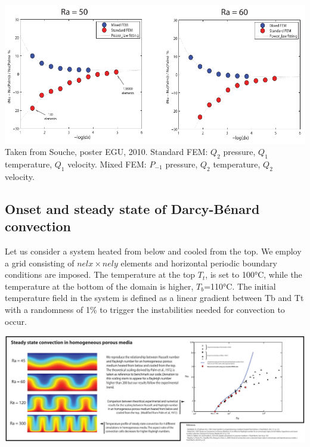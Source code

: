 \begin{center}
\includegraphics[width=14cm]{python_codes/fieldstone_107/images/souche_bench}\\
Taken from Souche, poster EGU, 2010. Standard FEM: $Q_2$ pressure, 
$Q_1$ temperature, $Q_1$ velocity. 
Mixed FEM: $P_{-1}$ pressure, $Q_2$ temperature, $Q_2$ velocity.
\end{center}





\subsection*{Onset and steady state of Darcy-B\'enard convection}

Let us consider a system heated from below and cooled from the top. We employ a grid consisting of $nelx\times nely$ elements and horizontal periodic boundary conditions are imposed. The temperature at the top $T_t$, is set to 100\si{\celsius}, while the temperature at the bottom of the domain is higher, $T_b$=110\si{\celsius}. The initial temperature field in the system is defined as a linear gradient between Tb and Tt with a randomness of 1\% to trigger the instabilities needed for convection to occur. 


\begin{center}
\includegraphics[width=14cm]{python_codes/fieldstone_107/images/souche_conv}
\end{center}

